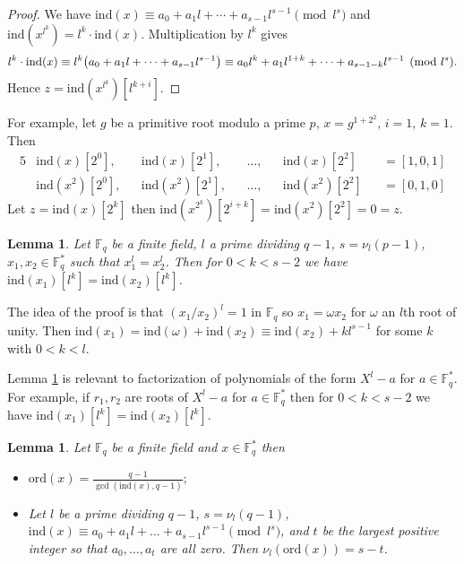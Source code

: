\documentclass{article}
\let\originalleft\left
\let\originalright\right
\renewcommand{\left}{\mathopen{}\mathclose\bgroup\originalleft}
\renewcommand{\right}{\aftergroup\egroup\originalright}
\newcounter{dummy} \numberwithin{dummy}{section}
\theoremstyle{plain}
\newtheorem{lem}[dummy]{Lemma}
\theoremstyle{definition}
\def\Fq {{ \mathbb{F} _ {q} }}
\def\FQ {{ \mathbb{F}^* _ {q} }}
\def\ind {{ \mathrm{ind} }}
\def\ord {{ \mathrm{ord} }}
\begin{document}
		\begin{proof}
		    We have $\ind(x) \equiv a_0+a_1l+\cdots+a_{s-1}l^{s-1} \pmod {l^s}$ and $\ind(x^{l^k})=l^k \cdot \ind(x)$. Multiplication by $l^k$ gives
				    \[ l^k \cdot \ind(x) \equiv l^k \left( a_0+a_1l+\cdots+a_{s-1}l^{s-1} \right) \equiv {a_0}l^{k}+{a_1}l^{1+k}+\cdots+a_{s-1-k}l^{s-1} \pmod {l^s}. \]	
				Hence $z=\ind(x^{l^k})[l^{k+i}]$.
				
		\end{proof}
		
		For example, let $g$ be a primitive root modulo a prime $p$, $x=g^{1+2^2}$, $i=1$, $k=1$. Then 
		\begin{alignat*}{5}
		  &\ind(x)[2^0]  ,&&\ind(x)[2^1]  ,&& \ldots,&& \ind(x)[2^2]   &&= [1,0,1] \\
		  &\ind(x^2)[2^0],&&\ind(x^2)[2^1],&& \ldots,&& \ind(x^2)[2^2] &&= [0,1,0] 
		\end{alignat*}
		Let $z=\ind(x)[2^k]$ then $\ind(x^{2^k})[2^{i+k}]=\ind(x^2)[2^2]=0=z$.
		
		\begin{lem}
		\label{LEM:comRoot}
		    Let $\Fq$ be a finite field, $l$ a prime dividing $q-1$, $s=\nu_l(p-1)$, $x_1,x_2 \in \FQ$ such that $x_1^l=x_2^l$. Then for $0 < k < s-2$ we have $\ind(x_1)[l^k]=\ind(x_2)[l^k]$.
		\end{lem}
		
		The idea of the proof is that $(x_1/x_2)^l = 1$ in $\Fq$ so $x_1 = \omega x_2$ for $\omega$ an $l$th root of unity. Then $\ind(x_1)=\ind(\omega)+\ind(x_2) \equiv \ind(x_2) + kl^{s-1}$ for some $k$ with $0<k<l$. 
		
		Lemma \ref{LEM:comRoot} is relevant to factorization of polynomials of the form $X^l-a$ for $a \in \FQ$. For example, if $r_1, r_2$ are roots of $X^l-a$ for $a \in \FQ$ then for $0 < k < s-2$ we have $\ind(x_1)[l^k]=\ind(x_2)[l^k]$.
		
		\begin{lem}
		\label{LEM:ordInd}
		    Let $\Fq$ be a finite field and $x \in \FQ$ then 
				\begin{itemize}
				\item $\ord(x)=\frac {q-1}{\gcd(\ind(x),q-1)};$
				\item Let $l$ be a prime dividing $q-1$, $s=\nu_l(q-1)$, $\ind(x)\equiv a_0+a_1l+\ldots+a_{s-1}l^{s-1} \pmod {l^s}$, and $t$ be the largest positive integer so that $a_0,\ldots,a_t$ are all zero. Then $\nu_l(\ord(x))=s-t$.
				\end{itemize}
		\end{lem}
		
\end{document}

